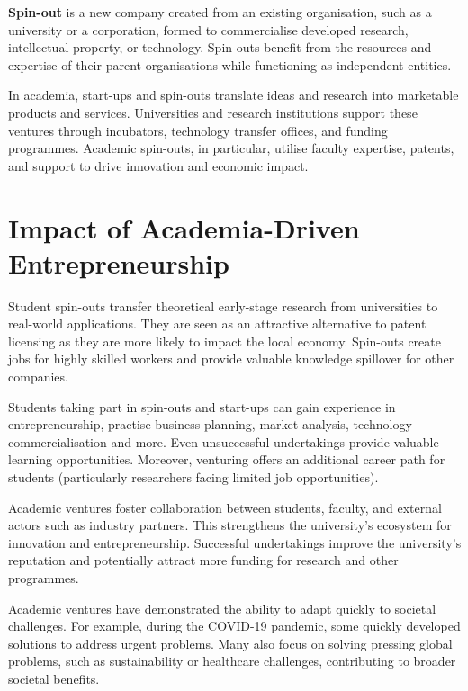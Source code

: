 \textbf{Spin-out} is a new company created from an existing organisation, such as a university or a corporation, formed to commercialise developed research, intellectual property, or technology. Spin-outs benefit from the resources and expertise of their parent organisations while functioning as independent entities.\cite{mfmac_spin-out}

In academia, start-ups and spin-outs translate ideas and research into marketable products and services. Universities and research institutions support these ventures through incubators, technology transfer offices, and funding programmes. Academic spin-outs, in particular, utilise faculty expertise, patents, and support to drive innovation and economic impact.

\section{Impact of Academia-Driven Entrepreneurship}
Student spin-outs transfer theoretical early-stage research from universities to real-world applications. They are seen as an attractive alternative to patent licensing as they are more likely to impact the local economy. Spin-outs create jobs for highly skilled workers and provide valuable knowledge spillover for other companies.\cite{Caputo_spin-offs-impact}

Students taking part in spin-outs and start-ups can gain experience in entrepreneurship, practise business planning, market analysis, technology commercialisation and more. Even unsuccessful undertakings provide valuable learning opportunities. Moreover, venturing offers an additional career path for students (particularly researchers facing limited job opportunities).\cite{kauffman_tech-transfer}

Academic ventures foster collaboration between students, faculty, and external actors such as industry partners. This strengthens the university's ecosystem for innovation and entrepreneurship. Successful undertakings improve the university's reputation and potentially attract more funding for research and other programmes.

Academic ventures have demonstrated the ability to adapt quickly to societal challenges. For example, during the COVID-19 pandemic, some quickly developed solutions to address urgent problems. Many also focus on solving pressing global problems, such as sustainability or healthcare challenges, contributing to broader societal benefits.\cite{Battaglia_spin-off-response}

